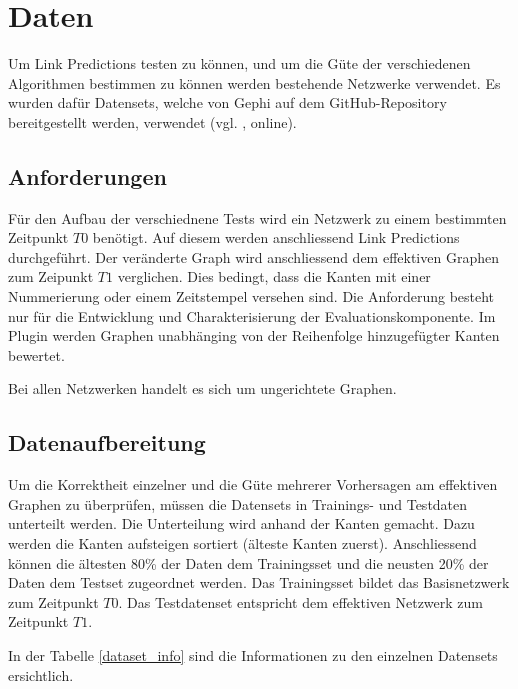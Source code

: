 \chapter{Daten}
\label{daten}
Um Link Predictions testen zu können, und um die Güte der verschiedenen Algorithmen bestimmen zu können werden bestehende Netzwerke verwendet.
Es wurden dafür Datensets, welche von Gephi auf dem GitHub-Repository bereitgestellt werden, verwendet (vgl. \cite{moll_datasets_2018}, online).

\section{Anforderungen}
Für den Aufbau der verschiednene Tests wird ein Netzwerk zu einem bestimmten Zeitpunkt $T0$ benötigt.
Auf diesem werden anschliessend Link Predictions durchgeführt.
Der veränderte Graph wird anschliessend dem effektiven Graphen zum Zeipunkt $T1$ verglichen.
Dies bedingt, dass die Kanten mit einer Nummerierung oder einem Zeitstempel versehen sind.
Die Anforderung besteht nur für die Entwicklung und Charakterisierung der Evaluationskomponente.
Im Plugin werden Graphen unabhänging von der Reihenfolge hinzugefügter Kanten bewertet.

Bei allen Netzwerken handelt es sich um ungerichtete Graphen.

\section{Datenaufbereitung}
Um die Korrektheit einzelner und die Güte mehrerer Vorhersagen am effektiven Graphen zu überprüfen, müssen die Datensets in Trainings- und Testdaten unterteilt werden.
Die Unterteilung wird anhand der Kanten gemacht. Dazu werden die Kanten aufsteigen sortiert (älteste Kanten zuerst).
Anschliessend können die ältesten 80\% der Daten dem Trainingsset und die neusten 20\% der Daten dem Testset zugeordnet werden.
Das Trainingsset bildet das Basisnetzwerk zum Zeitpunkt $T0$.
Das Testdatenset entspricht dem effektiven Netzwerk zum Zeitpunkt $T1$.

In der Tabelle \ref{dataset_info} sind die Informationen zu den einzelnen Datensets ersichtlich.

